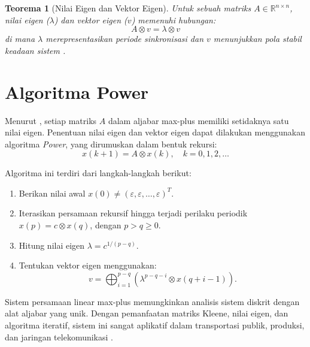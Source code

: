 \documentclass{file/TA-ITS}
\newtheorem{teorema}[definisi]{Teorema}
\theoremstyle{definition}
\theoremstyle{definition}
\theoremstyle{plain}
\newcommand{\Real}{\mathbb{R}}
\begin{document}
\begin{teorema}[Nilai Eigen dan Vektor Eigen]
Untuk sebuah matriks \(A \in \Real^{n \times n}\), nilai eigen (\(\lambda\)) dan vektor eigen (\(v\)) memenuhi hubungan:
\[
A \otimes v = \lambda \otimes v
\]
di mana \(\lambda\) merepresentasikan periode sinkronisasi dan \(v\) menunjukkan pola stabil keadaan sistem \cite{baccelli}.
\end{teorema}

\section{Algoritma Power}
Menurut \citeauthor{andro2020}, setiap matriks \( A \) dalam aljabar max-plus memiliki setidaknya satu nilai eigen. Penentuan nilai eigen dan vektor eigen dapat dilakukan menggunakan algoritma \textit{Power}, yang dirumuskan dalam bentuk rekursi:
\[
x(k+1) = A \otimes x(k), \quad k = 0, 1, 2, \dots
\]

Algoritma ini terdiri dari langkah-langkah berikut:
\begin{enumerate}
     \item Berikan nilai awal \( x(0) \neq (\varepsilon, \varepsilon, \dots, \varepsilon)^T \).
        \item Iterasikan persamaan rekursif hingga terjadi perilaku periodik \( x(p) = c \otimes x(q) \), dengan \( p > q \geq 0 \).
        \item Hitung nilai eigen \( \lambda = c^{1/(p-q)} \).
        \item Tentukan vektor eigen menggunakan:
        \[
        v = \bigoplus_{i=1}^{p-q} \left( \lambda^{p-q-i} \otimes x(q+i-1) \right).
        \]
\end{enumerate}

Sistem persamaan linear max-plus memungkinkan analisis sistem diskrit dengan alat aljabar yang unik. Dengan pemanfaatan matriks Kleene, nilai eigen, dan algoritma iteratif, sistem ini sangat aplikatif dalam transportasi publik, produksi, dan jaringan telekomunikasi \cite{andro2020, subiono2015minmaxplus}.

\pagebreak
\end{document}
